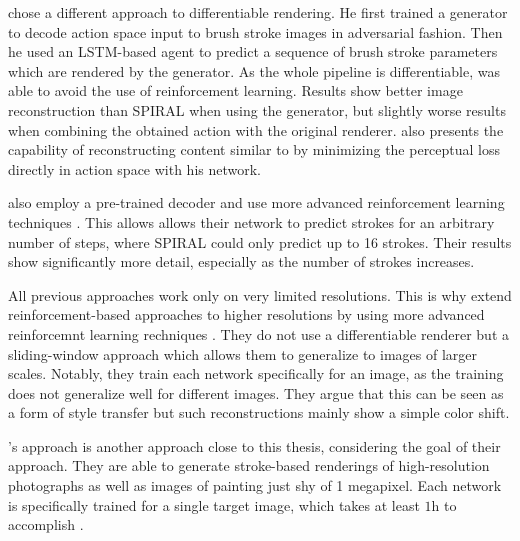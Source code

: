 \citeauthor*{neuralpainters} chose a different approach to differentiable rendering.
He first trained a generator to decode action space input to brush stroke images in adversarial fashion.
Then he used an LSTM-based agent to predict a sequence of brush stroke parameters which are rendered by the generator.
As the whole pipeline is differentiable, \citeauthor{neuralpainters} was able to avoid the use of reinforcement learning.
Results show better image reconstruction than SPIRAL when using the generator, but slightly worse results when combining the obtained action with the original renderer.
\citeauthor{neuralpainters} also presents the capability of reconstructing content similar to \citeauthor{gatys} by minimizing the perceptual loss directly in action space with his network.

\citeauthor*{learning2paint} also employ a pre-trained decoder and use more advanced reinforcement learning techniques \cite{learning2paint}.
This allows allows their network to predict strokes for an arbitrary number of steps, where SPIRAL could only predict up to 16 strokes.
Their results show significantly more detail, especially as the number of strokes increases.

All previous approaches work only on very limited resolutions.
This is why \citeauthor*{paintbot} extend reinforcement-based approaches to higher resolutions by using more advanced reinforcemnt learning rechniques \cite{paintbot, LpaintB}.
They do not use a differentiable renderer but a sliding-window approach which allows them to generalize to images of larger scales.
Notably, they train each network specifically for an image, as the training does not generalize well for different images.
They argue that this can be seen as a form of style transfer but such reconstructions mainly show a simple color shift.

\citeauthor*{LpaintB}'s approach is another approach close to this thesis, considering the goal of their approach.
They are able to generate stroke-based renderings of high-resolution photographs as well as images of painting just shy of 1 megapixel.
Each network is specifically trained for a single target image, which takes at least $1 \si{\hour}$ to accomplish \cite{paintbot}.


